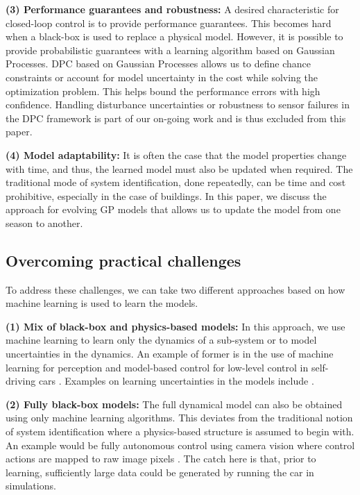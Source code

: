 \noindent \textbf{(3) Performance guarantees and robustness:} A desired characteristic for closed-loop control is to provide performance guarantees. This becomes hard when a black-box is used to replace a physical model. However, it is possible to provide probabilistic guarantees with a learning algorithm based on Gaussian Processes. DPC based on Gaussian Processes allows us to define chance constraints or account for model uncertainty in the cost while solving the optimization problem. This helps bound the performance errors with high confidence. Handling disturbance uncertainties or robustness to sensor failures in the DPC framework is part of our on-going work and is thus excluded from this paper.

\noindent \textbf{(4) Model adaptability:} It is often the case that the model properties change with time, and thus, the learned model must also be updated when required. The traditional mode of system identification, done repeatedly, can be time and cost prohibitive, especially in the case of buildings. In this paper, we discuss the approach for evolving GP models that allows us to update the model from one season to another.


\subsection{Overcoming practical challenges}
To address these challenges, we can take two different approaches based on how machine learning is used to learn the models.

\noindent \textbf{(1) Mix of black-box and physics-based models:} In this approach, we use machine learning to learn only the dynamics of a sub-system or to model uncertainties in the dynamics. An example of former is in the use of machine learning for perception and model-based control for low-level control in self-driving cars \cite{Urmson2008}. Examples on learning uncertainties in the models include \cite{Berkenkamp2015,Desaraju2016}.

\noindent \textbf{(2) Fully black-box models:} The full dynamical model can also be obtained using only machine learning algorithms. This deviates from the traditional notion of system identification where a physics-based structure is assumed to begin with. An example would be fully autonomous control using camera vision where control actions are mapped to raw image pixels \cite{Bojarski2016}. The catch here is that, prior to learning, sufficiently large data could be generated by running the car in simulations.

